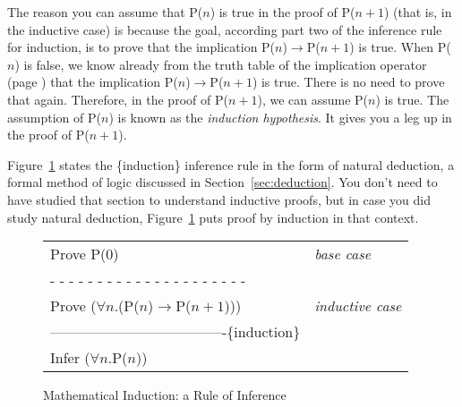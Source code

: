 The reason you can assume that P($n$) is true in the proof of P($n+1$)
(that is, in the inductive case)
is because the goal, according part two of the inference rule
for induction, is to prove that the implication
P($n$)$\rightarrow$P($n+1$) is true.
When P($n$) is false, we know already from the truth table
of the implication operator (page \pageref{implication-truth-table})
that the implication P($n$)$\rightarrow$P($n+1$) is true.
There is no need to prove that again.
Therefore, in the proof of P($n+1$), we can assume P($n$) is true.
The assumption of P($n$) is known as the
\emph{induction hypothesis}.
It gives you a leg up in the proof of P($n+1$).

Figure~\ref{induction-rule} states the \{induction\} inference rule
in the form of natural deduction, a formal method of logic discussed
in Section~\ref{sec:deduction}. You don't need to have studied that
section to understand inductive proofs, but in case you did study
natural deduction, Figure~\ref{induction-rule} puts proof by
induction in that context.

\begin{figure}
\begin{spacing}{0.9}
\begin{tabular}{ll}
Prove P(0)                                         &\emph{base case}\\
 - - - - - - - - - - - - - - - - - - - - -         &\\
Prove ($\forall$$n$.(P($n$)$\rightarrow$P($n+1$))) &\emph{inductive case}\\
-------------------------------------\{induction\} &\\
Infer ($\forall$$n$.P($n$))                        &\\
\end{tabular}
\end{spacing}
\caption{Mathematical Induction: a Rule of Inference}
\label{fig-04-01}\label{induction-rule}
\end{figure}

